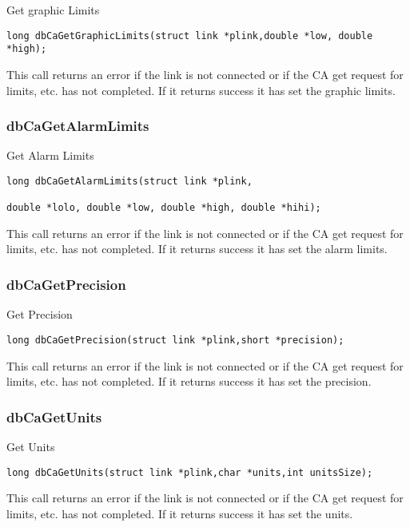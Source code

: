 Get graphic Limits

\begin{verbatim}long dbCaGetGraphicLimits(struct link *plink,double *low, double *high);
\end{verbatim}This call returns an error if the link is not connected or if the CA get request for limits, etc. has not completed. If it returns 
success it has set the graphic limits.

\subsubsection{dbCaGetAlarmLimits}

Get Alarm Limits

\begin{verbatim}long dbCaGetAlarmLimits(struct link *plink,

double *lolo, double *low, double *high, double *hihi);
\end{verbatim}This call returns an error if the link is not connected or if the CA get request for limits, etc. has not completed. If it returns 
success it has set the alarm limits.

\subsubsection{dbCaGetPrecision}

Get Precision

\begin{verbatim}long dbCaGetPrecision(struct link *plink,short *precision);
\end{verbatim}This call returns an error if the link is not connected or if the CA get request for limits, etc. has not completed. If it returns 
success it has set the precision.

\subsubsection{dbCaGetUnits}

Get Units

\begin{verbatim}long dbCaGetUnits(struct link *plink,char *units,int unitsSize);
\end{verbatim}This call returns an error if the link is not connected or if the CA get request for limits, etc. has not completed. If it returns 
success it has set the units.










